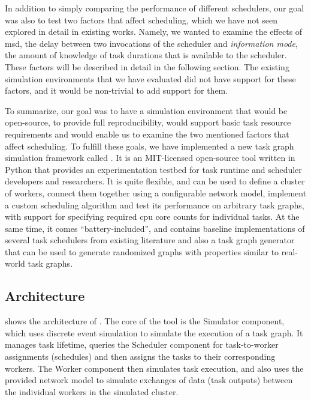 In addition to simply comparing the performance of different schedulers, our goal was also to test
two factors that affect scheduling, which we have not seen explored in detail in existing works.
Namely, we wanted to examine the effects of \gls{msd}, the delay between two
invocations of the scheduler and \emph{information mode}, the amount of knowledge of task durations
that is available to the scheduler. These factors will be described in detail in the following
section. The existing simulation environments that we have evaluated did not have support for these
factors, and it would be non-trivial to add support for them.

To summarize, our goal was to have a simulation environment that would be open-source, to provide
full reproducibility, would support basic task resource requirements and would enable us to examine
the two mentioned factors that affect scheduling. To fulfill these goals, we have implemented a new
task graph simulation framework called \estee{}. It is an \mbox{MIT-licensed}
open-source tool written in Python that provides an experimentation testbed
for task runtime and scheduler developers and researchers. It is quite flexible, and can be used to
define a cluster of workers, connect them together using a configurable network model, implement a
custom scheduling algorithm and test its performance on arbitrary task graphs, with support for
specifying required \gls{cpu} core counts for individual tasks. At the same time, it
comes ``battery-included'', and contains baseline implementations of several task schedulers from
existing literature and also a task graph generator that can be used to generate randomized graphs
with properties similar to real-world task graphs.

\subsection{Architecture}
 shows the architecture of \estee{}. The core of the
tool is the Simulator component, which uses discrete event simulation to simulate the execution of
a task graph. It manages task lifetime, queries the Scheduler component for task-to-worker
assignments (schedules) and then assigns the tasks to their corresponding workers. The Worker
component then simulates task execution, and also uses the provided network model to simulate
exchanges of data (task outputs) between the individual workers in the simulated cluster.

